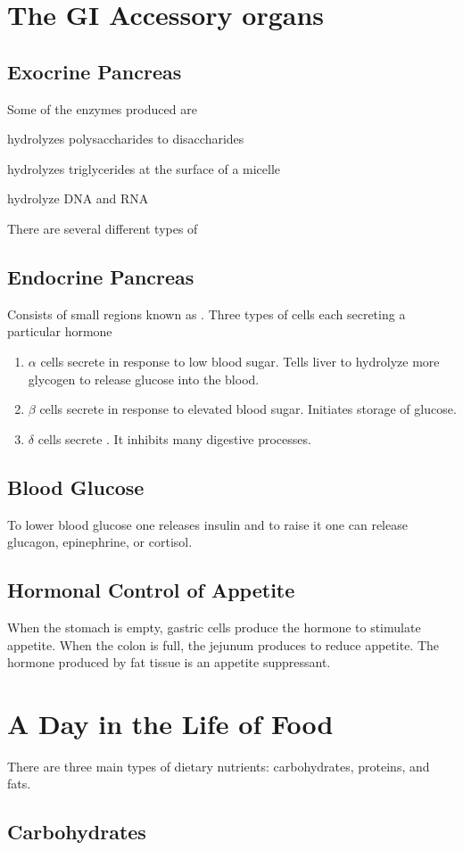 \documentclass[../Bio_chemistryReview.tex]{subfiles}
\begin{document}
\section{The GI Accessory organs}
\subsection{Exocrine Pancreas}
Some of the enzymes produced are
\begin{description}
    \item {} hydrolyzes polysaccharides to
        disaccharides
    \item {} hydrolyzes triglycerides at the surface of
        a micelle
    \item {} hydrolyze DNA and RNA
    \item There are several different types of 
\end{description}

\subsection{Endocrine Pancreas}
Consists of small regions known as . Three types
of cells each secreting a particular hormone
\begin{enumerate}
    \item $ \alpha $ cells secrete  in response to low blood
        sugar. Tells liver to hydrolyze more glycogen to release glucose into
        the blood.
    \item $ \beta $ cells secrete  in response to elevated
        blood sugar. Initiates storage of glucose. 
    \item $ \delta $ cells secrete . It inhibits many
        digestive processes.
\end{enumerate}

\subsection{Blood Glucose}
To lower blood glucose one releases insulin and to raise it one can release
glucagon, epinephrine, or cortisol.

\subsection{Hormonal Control of Appetite}
When the stomach is empty, gastric cells produce the hormone 
to stimulate appetite. When the colon is full, the jejunum produces
 to reduce appetite. The hormone  produced
by fat tissue is an appetite suppressant.

\section{A Day in the Life of Food}
There are three main types of dietary nutrients: carbohydrates, proteins, and
fats.

\subsection{Carbohydrates}
\end{document}
